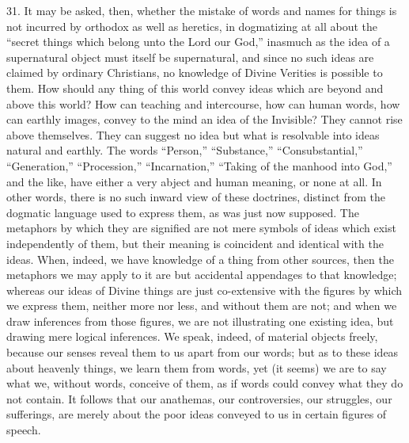 31. It may be asked, then, whether the mistake of words and names
for things is not incurred by orthodox as well as heretics, in
dogmatizing at all about the ``secret things which belong unto the
Lord our God,'' inasmuch as the idea of a supernatural object must
itself be supernatural, and since no such ideas are claimed by
ordinary Christians, no knowledge of Divine Verities is possible to
them. How should any thing of this world convey ideas which are beyond
and above this world? How can teaching and intercourse, how can human
words, how can earthly images, convey to the mind an idea of the
Invisible? They cannot rise above themselves. They can suggest no idea
but what is resolvable into ideas natural and earthly. The words
``Person,'' ``Substance,'' ``Consubstantial,''
``Generation,'' ``Procession,''
``Incarnation,'' ``Taking of the manhood into God,''
and the like, have either a very abject and human meaning, or none at
all. In other words, there is no such inward view of these doctrines,
distinct from the dogmatic language used to express them, as was just
now supposed. The metaphors by which they are signified are not mere
symbols of ideas which exist independently of them, but their meaning
is coincident and identical with the ideas. When, indeed, we have
knowledge of a thing from other sources, then the metaphors we may
apply to it are but accidental appendages to that knowledge; whereas
our ideas of Divine things are just co-extensive with the figures by
which we express them, neither more nor less, and without them are
not; and when we draw inferences from those figures, we are not
illustrating one existing idea, but drawing mere logical inferences.
We speak, indeed, of material objects freely, because our senses
reveal them to us apart from our words; but as to these ideas about
heavenly things, we learn them from words, yet (it seems) we are to
say what we, without words, conceive of them, as if words could convey
what they do not contain. It follows that our anathemas, our
controversies, our struggles, our sufferings, are merely about the
poor ideas conveyed to us in certain figures of speech.

